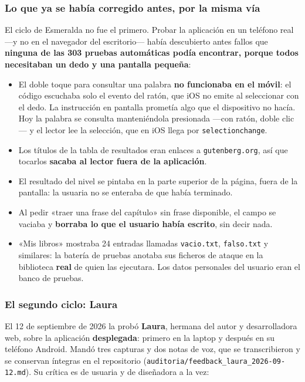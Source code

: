 \documentclass[11pt,a4paper]{article}
\newcommand{\cod}[1]{\texttt{\small #1}}
\begin{document}
\subsubsection{Lo que ya se había corregido antes, por la misma vía}

El ciclo de Esmeralda no fue el primero. Probar la aplicación en un teléfono real —y no
en el navegador del escritorio— había descubierto antes fallos que \textbf{ninguna de
las 303 pruebas automáticas podía encontrar, porque todos necesitaban un dedo y una
pantalla pequeña}:

\begin{itemize}[leftmargin=*, itemsep=3pt]
  \item El doble toque para consultar una palabra \textbf{no funcionaba en el móvil}: el
        código escuchaba solo el evento del ratón, que iOS no emite al seleccionar con
        el dedo. La instrucción en pantalla prometía algo que el dispositivo no hacía.
        Hoy la palabra se consulta manteniéndola presionada —con ratón, doble clic— y el
        lector lee la selección, que en iOS llega por \cod{selectionchange}.
  \item Los títulos de la tabla de resultados eran enlaces a \cod{gutenberg.org}, así
        que tocarlos \textbf{sacaba al lector fuera de la aplicación}.
  \item El resultado del nivel se pintaba en la parte superior de la página, fuera de la
        pantalla: la usuaria no se enteraba de que había terminado.
  \item Al pedir «traer una frase del capítulo» sin frase disponible, el campo se vaciaba
        y \textbf{borraba lo que el usuario había escrito}, sin decir nada.
  \item «Mis libros» mostraba 24 entradas llamadas \cod{vacio.txt}, \cod{falso.txt} y
        similares: la batería de pruebas anotaba sus ficheros de ataque en la biblioteca
        \textbf{real} de quien las ejecutara. Los datos personales del usuario eran el
        banco de pruebas.
\end{itemize}

\subsubsection{El segundo ciclo: Laura}
\label{sec:laura}

El 12 de septiembre de 2026 la probó \textbf{Laura}, hermana del autor y desarrolladora
web, sobre la aplicación \textbf{desplegada}: primero en la laptop y después en su
teléfono Android. Mandó tres capturas y dos notas de voz, que se transcribieron y se
conservan íntegras en el repositorio (\cod{auditoria/\allowbreak feedback\_laura\_2026-09-12.md}).
Su crítica es de usuaria y de diseñadora a la vez:
\end{document}
